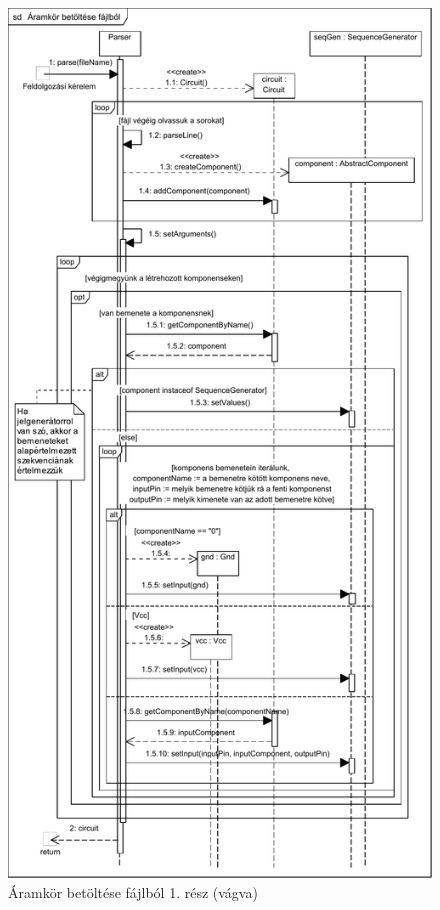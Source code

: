 \begin{figure}[H]
\begin{center}
\includegraphics*[viewport = 0 581 500 990]{chapters/chapter03/seqdiagrams/aramkor_betoltese_fajlbol.pdf}
\caption{Áramkör betöltése fájlból 1. rész (vágva)}
\label{fig:aramkor_betoltese_fajlbol}
\end{center}
\end{figure}

